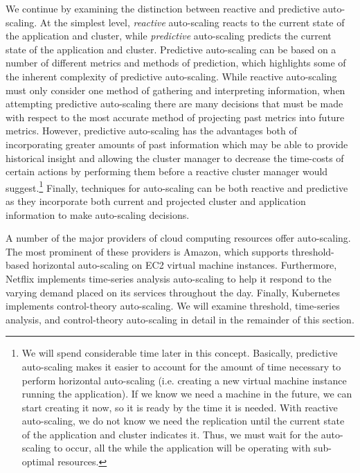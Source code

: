 We continue by examining the distinction between reactive and predictive
auto-scaling. At the simplest level, \textit{reactive} auto-scaling reacts to
the current state of the application and cluster, while \textit{predictive}
auto-scaling predicts the current state of the application and cluster.\cite[pg.
12]{auto-scaling-techniques-for-elastic-applications-in-cloud-environments}
Predictive auto-scaling can be based on a number of different metrics and
methods of prediction, which highlights some of the inherent complexity of
predictive auto-scaling. While reactive auto-scaling must only consider one
method of gathering and interpreting information, when attempting predictive
auto-scaling there are many decisions that must be made with respect to the
most accurate method of projecting past metrics into future metrics. However,
predictive auto-scaling has the advantages both of incorporating greater amounts
of past information which may be able to provide historical insight and allowing
the cluster manager to decrease the time-costs of certain actions by performing
them before a reactive cluster manager would suggest.\footnote{We will spend
considerable time later in this concept. Basically, predictive auto-scaling
makes it easier to account for the amount of time necessary to perform
horizontal auto-scaling (i.e. creating a new virtual machine instance running
the application). If we know we need a machine in the future, we can start
creating it now, so it is ready by the time it is needed. With reactive
auto-scaling, we do not know we need the replication until the current state of
the application and cluster indicates it. Thus, we must wait for the
auto-scaling to occur, all the while the application will be operating with
sub-optimal resources.}
Finally, techniques for auto-scaling can be both reactive and predictive as
they incorporate both current and projected cluster and application information
to make auto-scaling decisions.

A number of the major providers of cloud computing resources offer auto-scaling.
The most prominent of these providers is Amazon, which supports threshold-based
horizontal auto-scaling on EC2 virtual machine
instances.\cite{amazon-auto-scaling-developer-guide} Furthermore, Netflix
implements time-series analysis auto-scaling to help it respond to the
varying demand placed on its services throughout the
day.\cite{netflix-scryer-part-i} Finally, Kubernetes
implements control-theory auto-scaling.\cite{k8s-horizontal-pod-autoscaler-proposal}
We will examine threshold, time-series analysis, and control-theory
auto-scaling in detail in the remainder of this section.

